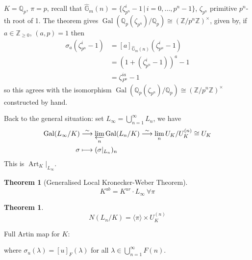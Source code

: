 \documentclass[a4paper]{article}
\theoremstyle{definition}
\theoremstyle{default}
\newtheorem{theorem}[definition]{Theorem}
\theoremstyle{remark}
\DeclareMathOperator{\Gal}{Gal}
\DeclareMathOperator{\Frob}{Frob}
\DeclareMathOperator{\Art}{Art}
\begin{document}
$K=\mathbb{Q}_p$, $\pi = p$,
recall that $\hat{\mathbb{G}}_m(n) = \{\zeta_{p^n}^i - 1 \,|\, i = 0, \dots, p^n-1 \}$,
$\zeta_{p^n}$ primitive $p^n$-th root of 1.
The theorem gives $\Gal(\mathbb{Q}_p(\zeta_{p^n})/\mathbb{Q}_p) \cong (\mathbb{Z}/p^n\mathbb{Z})^\times$,
given by, if $a \in \mathbb{Z}_{\geq 0}$, $(a, p)=1$ then
\begin{align*}
	\sigma_a(\zeta_{p^n}^i - 1) &= [a]_{\hat{\mathbb{G}}_m(n)}(\zeta_{p^n}^i - 1) \\
	&= (1+(\zeta_{p^n}^i - 1))^a -1 \\
	&= \zeta_{P^n}^{ia}-1
\end{align*}
so this agrees with the isomorphism $\Gal(\mathbb{Q}_p(\zeta_{p^n})/\mathbb{Q}_p) \cong (\mathbb{Z}/p^n\mathbb{Z})^\times$
constructed by hand.

Back to the general situation: set $L_\infty = \bigcup_{n=1}^\infty L_n$, we have
\begin{align*}
	\Gal(L_\infty/K) &\overset{\sim}{\longrightarrow} \varprojlim_n \Gal(L_n/K) \overset{\sim}{\longrightarrow} \lim_n U_K/U_K^{(n)} \cong U_K \\
	\sigma & \longmapsto (\sigma|_{L_n})_n
\end{align*}
This is $\Art_K|_{L_\infty}$.

\begin{theorem}[Generalised Local Kronecker-Weber Theorem]
	$$K^{ab} = K^{ur}\cdot L_\infty\ \forall \pi$$
\end{theorem}

\begin{theorem}
	$$N(L_n/K) = \langle \pi \rangle \times U_K^{(n)}$$
\end{theorem}

Full Artin map for $K$:
\begin{center}
\end{center}
where $\sigma_u(\lambda) = [u]_F(\lambda)$ for all $\lambda \in \bigcup_{n=1}^\infty F(n)$.
\end{document}
